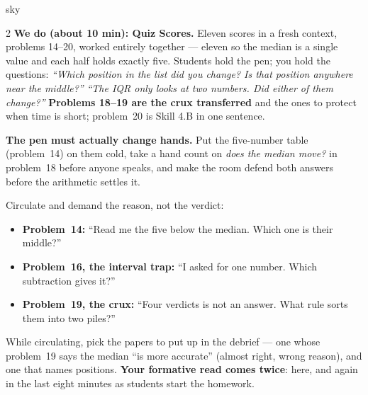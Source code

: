 \documentclass[10pt]{article}
\begin{document}
\begin{skillbox}{sky}
\begin{multicols}{2}
\columnbreak
\textbf{We do (about 10 min): Quiz Scores.} Eleven scores in a fresh context, problems 14--20,
worked entirely together --- eleven so the median is a single value and each half holds exactly
five. Students hold the pen; you hold the questions: \emph{``Which position in the list did you
change? Is that position anywhere near the middle?''} \quad \emph{``The IQR only looks at two
numbers. Did either of them change?''} \textbf{Problems 18--19 are the crux transferred} and the
ones to protect when time is short; problem~20 is Skill 4.B in one sentence.

\textbf{The pen must actually change hands.} Put the five-number table (problem~14) on them cold,
take a hand count on \emph{does the median move?} in problem~18 before anyone speaks, and make
the room defend both answers before the arithmetic settles it.

Circulate and demand the reason, not the verdict:
\begin{itemize}[leftmargin=1.1em, nosep]
  \item \textbf{Problem~14:} ``Read me the five below the median. Which one is their middle?''
  \item \textbf{Problem~16, the interval trap:} ``I asked for one number. Which subtraction gives
        it?''
  \item \textbf{Problem~19, the crux:} ``Four verdicts is not an answer. What rule sorts them
        into two piles?''
\end{itemize}
While circulating, pick the papers to put up in the debrief --- one whose problem~19 says the
median ``is more accurate'' (almost right, wrong reason), and one that names positions.
\textbf{Your formative read comes twice}: here, and again in the last eight minutes as students
start the homework.
\end{multicols}
\end{skillbox}
\end{document}
